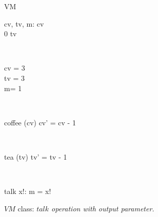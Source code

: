 \begin{figure}[H]
\centering
\begin{class}{VM}
\\
\begin{state}
cv, tv, m: \integer
{} \leq  cv 
\\
0 \leq  tv 
\end{state} 
\\
\begin{init}
cv = 3
\\tv = 3
\\ m= 1
\end{init} 
\\
\begin{op}{coffee}
\Delta (cv)
\ST
cv' = cv - 1
\end{op}
\\
\begin{op}{tea}
\Delta (tv)
\ST
tv' = tv - 1
\end{op}
\\
\begin{op}{talk}
x!: \integer
\ST
m = x!
\end{op}
\end{class}
\caption{$VM$ class: \textit{$talk$ operation with output parameter.}}
\label{oz_vm_with_operation_input_output_parameters}
\end{figure}